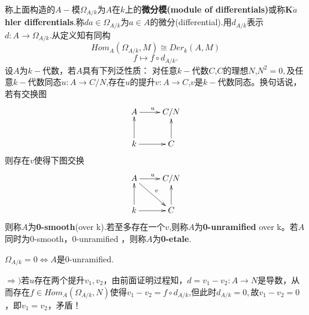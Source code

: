 \documentclass[UTF8]{article}
\begin{document}
称上面构造的$A-$模$\Omega_{A/k}$为$A$在$k$上的\textbf{微分模(module of differentials)}或称\textbf{K$\ddot{a}$hler differentials}.称$da\in \Omega_{A/k}$为$a\in A$的微分(differential).用$d_{A/k}$表示$d:A\rightarrow\Omega_{A/k}$.从定义知有同构
$$
 Hom_{A}(\Omega_{A/k},M)\cong Der_{k}(A,M)
$$
$$
f\mapsto f\circ d_{A/k}.
$$
设$A$为$k-$代数，若$A$具有下列泛性质：
对任意$k-$代数$C$,$C$的理想$N$,$N^2=0,$及任意$k-$代数同态$u:A\rightarrow C/N$,存在$u$的提升$v:A\rightarrow C$,$v$是$k-$代数同态。换句话说，若有交换图
$$
\xymatrix{
A\ar[r]^{u}&C/N\\
k\ar[u]\ar[r]&C\ar[u]
}
$$
则存在$v$使得下图交换
$$
\xymatrix{
A\ar[rd]^{v}\ar[r]^{u}&C/N\\
k\ar[u]\ar[r]&C\ar[u],
}
$$
则称$A$为\textbf{0-smooth}(over k).若至多存在一个$v$,则称$A$为\textbf{0-unramified} over k。若$A$同时为0-smooth，0-unramified ，则称$A$为\textbf{0-etale}.

  $\Omega_{A/k}=0\Leftrightarrow A$是0-unramified.

$\Rightarrow )$若$u$存在两个提升$v_{1},v_{2}$，由前面证明过程知，$d=v_{1}-v_{2}:A\rightarrow N$是导数，从而存在$f\in Hom_{A}(\Omega_{A/k},N)$使得$v_{1}-v_{2}=f\circ d_{A/k}$,但此时$d_{A/k}=0,$故$v_{1}-v_{2}=0$，即$v_{1}=v_{2}$，矛盾！
\end{document}
